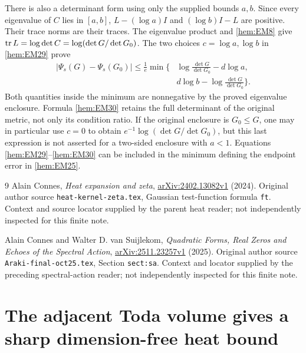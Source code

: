 \documentclass[11pt]{article}
\begin{document}
There is also a determinant form using only the supplied bounds
\(a,b\). Since every eigenvalue of \(C\) lies in \([a,b]\),
\(L-(\log a)I\) and \((\log b)I-L\) are positive. Their trace norms
are their traces. The eigenvalue product and \eqref{hem:EM8} give
\(\operatorname{tr} L=\log\det C=\log(\det G/\det G_0)\). The two choices
\(c=\log a,\log b\) in \eqref{hem:EM29} prove
\begin{equation}
 \begin{split}
 |\Psi_s(G)-\Psi_s(G_0)|\le\frac1e\min\biggl\{
 &\log\frac{\det G}{\det G_0}-d\log a,\\
 &d\log b-\log\frac{\det G}{\det G_0}\biggr\}.
 \end{split}
 \tag{EM30}\label{hem:EM30}
\end{equation}
Both quantities inside the minimum are nonnegative by the proved
eigenvalue enclosure. Formula \eqref{hem:EM30} retains the full determinant
of the original metric, not only its condition ratio. If the original
enclosure is \(G_0\le G\), one may in particular use \(c=0\) to obtain
\(e^{-1}\log(\det G/\det G_0)\), but this last expression is not asserted
for a two-sided enclosure with \(a<1\).
Equations \eqref{hem:EM29}--\eqref{hem:EM30} can be included in the minimum
defining the endpoint error in \eqref{hem:EM25}.

\begin{thebibliography}{9}
Alain Connes, \emph{Heat expansion and zeta},
\href{https://arxiv.org/abs/2402.13082v1}{arXiv:2402.13082v1} (2024).
Original author source \texttt{heat-kernel-zeta.tex}, Gaussian test-function
formula \texttt{ft}. Context and source locator supplied by the parent
heat reader; not independently inspected for this finite note.

Alain Connes and Walter D. van Suijlekom,
\emph{Quadratic Forms, Real Zeros and Echoes of the Spectral Action},
\href{https://arxiv.org/abs/2511.23257v1}{arXiv:2511.23257v1} (2025).
Original author source \texttt{Araki-final-oct25.tex},
Section \texttt{sect:sa}. Context and locator supplied by the preceding
spectral-action reader; not independently inspected for this finite note.
\end{thebibliography}

\endgroup

\clearpage\begingroup
\part*{The adjacent Toda volume gives a sharp dimension-free heat bound}
\newcommand{\hvhC}{\mathbb C}\newcommand{\hvhR}{\mathbb R}
\newcommand{\hvhtr}{\operatorname{tr}}\newcommand{\hvhnorm}[1]{\left\lVert#1\right\rVert}
\newtheorem{hvhtheorem}{Theorem}
\end{document}
